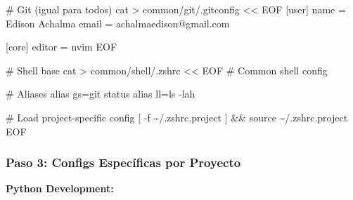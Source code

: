 \documentclass[
  doc,
  floatsintext,
  longtable,
  a4paper,
  nolmodern,
  notxfonts,
  notimes,
  12pt,
  colorlinks=true,linkcolor=blue,citecolor=blue,urlcolor=blue]{apa7}
\newenvironment{Shaded}{\begin{snugshade}}{\end{snugshade}}
\newcommand{\CommentTok}[1]{\textcolor[rgb]{0.37,0.37,0.37}{#1}}
\newcommand{\FunctionTok}[1]{\textcolor[rgb]{0.28,0.35,0.67}{#1}}
\newcommand{\NormalTok}[1]{\textcolor[rgb]{0.00,0.23,0.31}{#1}}
\newcommand{\OperatorTok}[1]{\textcolor[rgb]{0.37,0.37,0.37}{#1}}
\newcommand{\StringTok}[1]{\textcolor[rgb]{0.13,0.47,0.30}{#1}}
\begin{document}
\begin{Shaded}
\begin{Highlighting}[]
\CommentTok{\# Git (igual para todos)}
\FunctionTok{cat} \OperatorTok{\textgreater{}}\NormalTok{ common/git/.gitconfig }\OperatorTok{\textless{}\textless{} \textquotesingle{}EOF\textquotesingle{}}
\StringTok{[user]}
\StringTok{    name = Edison Achalma}
\StringTok{    email = achalmaedison@gmail.com}

\StringTok{[core]}
\StringTok{    editor = nvim}
\OperatorTok{EOF}

\CommentTok{\# Shell base}
\FunctionTok{cat} \OperatorTok{\textgreater{}}\NormalTok{ common/shell/.zshrc }\OperatorTok{\textless{}\textless{} \textquotesingle{}EOF\textquotesingle{}}
\StringTok{\# Common shell config}

\StringTok{\# Aliases}
\StringTok{alias gs=\textquotesingle{}git status\textquotesingle{}}
\StringTok{alias ll=\textquotesingle{}ls {-}lah\textquotesingle{}}

\StringTok{\# Load project{-}specific config}
\StringTok{[ {-}f \textasciitilde{}/.zshrc.project ] \&\& source \textasciitilde{}/.zshrc.project}
\OperatorTok{EOF}
\end{Highlighting}
\end{Shaded}

\subsubsection{Paso 3: Configs Específicas por
Proyecto}\label{paso-3-configs-especuxedficas-por-proyecto}

\textbf{Python Development:}
\end{document}
